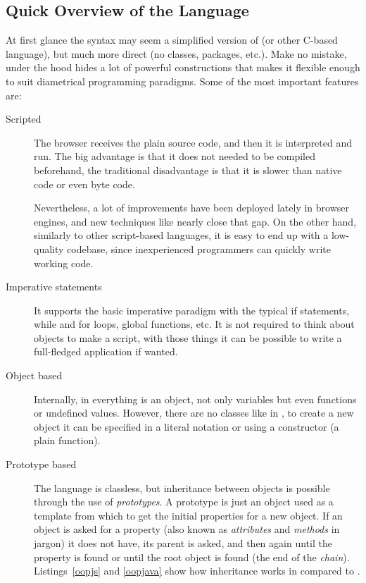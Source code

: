 \subsection{Quick Overview of the Language} %
\label{sub:overviewjavascript}

At first glance the syntax may seem a simplified version of  (or other C-based language), but much more direct (no classes, packages, etc.).
Make no mistake, under the hood  hides a lot of powerful constructions that makes it flexible enough to suit diametrical programming paradigms.
Some of the most important features are:

\begin{description}
  \item[Scripted] The browser receives the plain source code, and then it is interpreted and run.
  The big advantage is that it does not needed to be compiled beforehand, the traditional disadvantage is that it is slower than native code or even  byte code.
  
  Nevertheless, a lot of improvements have been deployed lately in browser engines, and new techniques like  nearly close that gap.
  On the other hand, similarly to other script-based languages, it is easy to end up with a low-quality codebase, since inexperienced programmers can quickly write working code.
  \item[Imperative statements] It supports the basic imperative paradigm with the typical if statements, while and for loops, global functions, etc.
  It is not required to think about objects to make a script, with those things it can be possible to write a full-fledged application if wanted.
  \item[Object based] Internally, in  everything is an object, not only variables but even functions or undefined values.
  However, there are no classes like in , to create a new object it can be specified in a literal notation or using a constructor (a plain function).
  \item[Prototype based] The language is classless, but inheritance between objects is possible through the use of \emph{prototypes}.
  A prototype is just an object used as a template from which to get the initial properties for a new object.
  If an object is asked for a property (also known as \emph{attributes} and \emph{methods} in  jargon) it does not have, its parent is asked, and then again until the property is found or until the root object is found (the end of the \emph{chain}).
  Listings~\vref{oopjs} and \vref{oopjava} show how inheritance works in  compared to .
  

\end{description}
